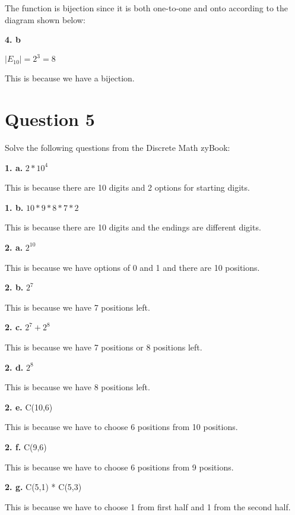 \documentclass[11pt]{article}
\begin{document}
    The function is bijection since it is both one-to-one and onto according to the diagram shown below:
	
	\vspace{80mm}
	\textbf{4. b}
	
	$|E_{10}| = 2^3 = 8$
	
	This is because we have a bijection.
	\newpage
	\section*{Question 5}
	Solve the following questions from the Discrete Math zyBook:
	
	\textbf{1. a.}
	$2*10^4$
	
	This is because there are 10 digits and 2 options for starting digits.
	
	\vspace{10mm}
	\textbf{1. b.}
	$10*9*8*7*2$
	
	This is because there are 10 digits and the endings are different digits.
	
	\vspace{10mm}
	\textbf{2. a.}
	$2^{10}$
	
	This is because we have options of 0 and 1 and there are 10 positions.
	
	\vspace{10mm}
	\textbf{2. b.}
	$2^7$
	
	This is because we have 7 positions left.
	
	\vspace{10mm}
	\textbf{2. c.}
	$2^7+2^8$
	
	This is because we have 7 positions or 8 positions left.
	
	\vspace{10mm}
	\textbf{2. d.}
	$2^8$
	
	This is because we have 8 positions left.
	
	\vspace{10mm}
	\textbf{2. e.}
	C(10,6)
	
	This is because we have to choose 6 positions from 10 positions.
	
	\vspace{10mm}
	\textbf{2. f.}
	C(9,6)
	
	This is because we have to choose 6 positions from 9 positions.
	
	\vspace{10mm}
	\textbf{2. g.}
	C(5,1) * C(5,3)
	
	This is because we have to choose 1 from first half and 1 from the second half.
	
\end{document}
